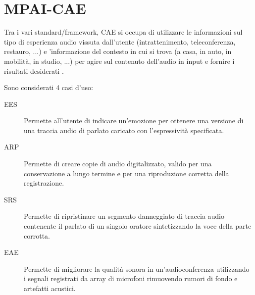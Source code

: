 \begin{adjustbox}{width=\textwidth}
\end{adjustbox} %



\section{MPAI-CAE} \label{sec:mpai-cae}
Tra i vari standard/framework, \ac{CAE} si occupa di utilizzare le informazioni sul tipo di esperienza audio vissuta dall'utente (intrattenimento, teleconferenza, restauro, ...) e 'informazione del contesto in cui si trova (a casa, in auto, in mobilità, in studio, ...) per agire sul contenuto dell'audio in input e fornire i risultati desiderati \cite{mpaiMPAICAE}.

Sono considerati 4 casi d'uso:
\begin{description}
    \item[\ac{EES}] Permette all'utente di indicare un'emozione per ottenere una versione di una traccia audio di parlato caricato con l'espressività specificata.
    \item[\ac{ARP}] Permette di creare copie di audio digitalizzato, valido per una conservazione a lungo termine e per una riproduzione corretta della registrazione.
    \item[\ac{SRS}] Permette di ripristinare un segmento danneggiato di traccia audio contenente il parlato di un singolo oratore sintetizzando la voce della parte corrotta.
    \item[\ac{EAE}] Permette di migliorare la qualità sonora in un'audioconferenza utilizzando i segnali registrati da array di microfoni rimuovendo rumori di fondo e artefatti acustici.
\end{description}

